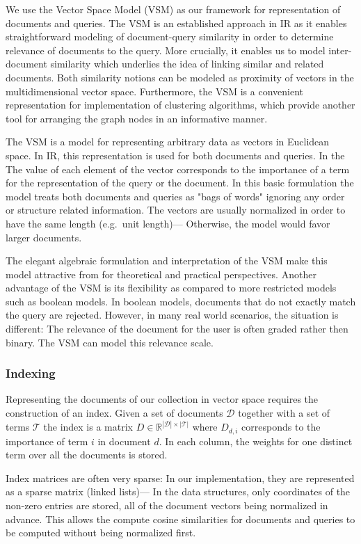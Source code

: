 We use the Vector Space Model (VSM) as our framework for representation of documents and queries. The VSM is an established approach in IR as it enables straightforward modeling of document-query similarity in order to determine relevance of documents to the query. More crucially, it enables us to model inter-document similarity which underlies the idea of linking similar and related documents. Both similarity notions can be modeled as proximity of vectors in the multidimensional vector space. Furthermore, the VSM is a convenient representation for implementation of clustering algorithms, which provide another tool for arranging the graph nodes in an informative manner.  

The VSM is a model for representing arbitrary data as vectors in Euclidean space. In IR, this representation is used for both documents and queries. In the The value of each element of the vector corresponds to the importance of a term for the representation of the query or the document. In this basic formulation the model treats both documents and queries as "bags of words" ignoring any order or structure related information. The vectors are usually normalized in order to have the same length (e.g.\ unit length)--- Otherwise, the model would favor larger documents. 

The elegant algebraic formulation and interpretation of the VSM make this model attractive from for theoretical and practical perspectives.
Another advantage of the VSM is its flexibility as compared to more restricted models such as boolean models. In boolean models, documents that do not exactly match the query are rejected. However, in many real world scenarios, the situation is different: The relevance of the document for the user is often graded rather then binary. The VSM can model this relevance scale.


\subsubsection{Indexing}
\label{sec:indexing}
Representing the documents of our collection in vector space requires the construction of an index. Given a set of documents $\mathcal{D}$ together with a set of terms $\mathcal{T}$ the index is a matrix $D \in \mathbb{R}^{|\mathcal{D}|\times |\mathcal{T}|}$ where $D_{d,i}$ corresponds to the importance of term $i$ in document $d$. In each column, the weights for one distinct term over all the documents is stored.

Index matrices are often very sparse: In our implementation, they are represented as a sparse matrix (linked lists)--- In the data structures, only coordinates of the non-zero entries are stored, all of the document vectors being normalized in advance. This allows the compute cosine similarities for documents and queries to be computed without being normalized first.

